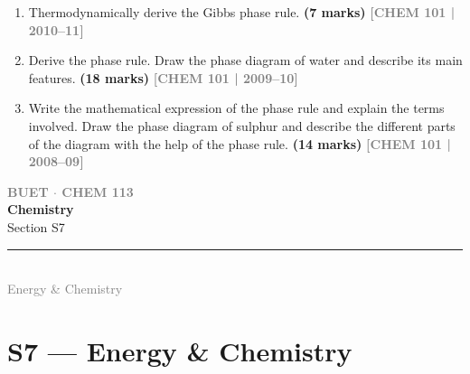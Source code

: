 \documentclass[12pt,a3paper]{article}
\newcommand{\yr}[1]{\hfill\textcolor{gray}{\small\textbf{[#1]}}}
\newcommand{\mk}[1]{\textcolor{orange!70!black}{\small\textbf{(#1 marks)}}}
\newcommand{\secdivider}[4]{%
  \newpage\thispagestyle{empty}%
  \vspace*{\fill}%
  \begin{tcolorbox}[enhanced,colback=#4!7,colframe=#3,boxrule=1.5pt,arc=8pt,
    left=20pt,right=20pt,top=22pt,bottom=22pt,
    shadow={3pt}{-3pt}{0pt}{black!15}]
    \centering
    {\large\textcolor{gray}{\textbf{BUET $\cdot$ CHEM 113}}}\\[8pt]
    {\fontsize{26}{32}\selectfont\bfseries\textcolor{#3}{Chemistry}}\\[6pt]
    {\fontsize{15}{19}\selectfont\textcolor{dgray}{#1}}\\[12pt]
    \textcolor{#3!60}{\rule{0.5\textwidth}{0.5pt}}\\[6pt]
    {\small\textcolor{gray}{#2}}
  \end{tcolorbox}%
  \vspace*{\fill}\newpage%
}
\begin{document}
\begin{enumerate}
\item Thermodynamically derive the Gibbs phase rule. \mk{7}
\yr{CHEM 101 | 2010--11}

\item Derive the phase rule. Draw the phase diagram of water and describe its main features. \mk{18}
\yr{CHEM 101 | 2009--10}




\item Write the mathematical expression of the phase rule and explain the terms involved. Draw the phase diagram of sulphur and describe the different parts of the diagram with the help of the phase rule. \mk{14}
\yr{CHEM 101 | 2008--09}





\end{enumerate}
\newpage

\secdivider{Section S7}{Energy \& Chemistry}{cG}{cG}
\label{sec:S7}
\section{S7 --- Energy \& Chemistry}
\end{document}
